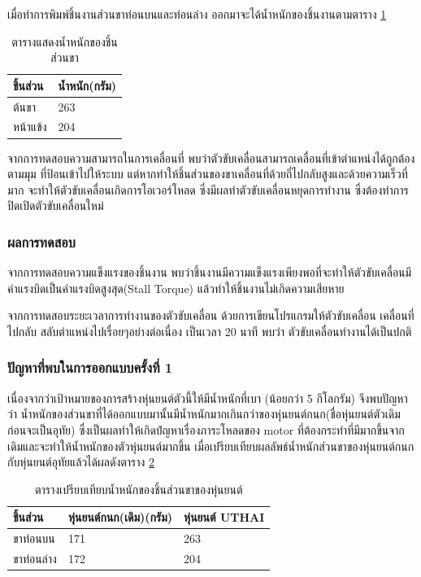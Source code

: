 เมื่อทำการพิมพ์ชิ้นงานส่วนขาท่อนบนและท่อนล่าง ออกมาจะได้น้ำหนักของชิ้นงานตามตาราง \ref{tab:UTHAI_leg}
\begin{table}[ht]
	\centering
	\begin{tabular}{| l | l |}
		\hline
		ชิ้นส่วน & น้ำหนัก(กรัม) \\
        \hline
        ต้นขา & 263 \\
        หน้าแข้ง & 204 \\
	    \hline
	\end{tabular}
	\caption{ตารางแสดงน้ำหนักของชิ้นส่วนขา}
	\label{tab:UTHAI_leg}
\end{table}

จากการทดสอบความสามารถในการเคลื่อนที่ พบว่าตัวขับเคลื่อนสามารถเคลื่อนที่เข้าตำแหน่งได้ถูกต้องตามมุม 
ที่ป้อนเข้าไปให้ระบบ แต่หากทำให้ชิ้นส่วนของขาเคลื่อนที่ด้วยถี่ไปกลับสูงและด้วยความเร็วที่มาก จะทำให้ตัวขับเคลื่อนเกิดการโอเวอร์โหลด 
ซึ่งมีผลทำตัวขับเคลื่อนหยุดการทำงาน ซึ่งต้องทำการปิดเปิดตัวขับเคลื่อนใหม่

\clearpage
\subsubsection*{ผลการทดสอบ}
จากการทดสอบความแข็งแรงของชิ้นงาน พบว่าชิ้นงานมีความแข็งแรงเพียงพอที่จะทำให้ตัวขับเคลื่อนมีค่าแรงบิดเป็นค่าแรงบิดสูงสุด(Stall Torque)
แล้วทำให้ชิ้นงานไม่เกิดความเสียหาย

จากการทดสอบระยะเวลาการทำงานของตัวขับเคลื่อน ด้วยการเขียนโปรแกรมให้ตัวขับเคลื่อน เคลื่อนที่ไปกลับ สลับตำแหน่งไปเรื่อยๆอย่างต่อเนื่อง เป็นเวลา 20 นาที
พบว่า ตัวขับเคลื่อนทำงานได้เป็นปกติ

\subsubsection*{ปัญหาที่พบในการออกแบบครั้งที่ 1}
เนื่องจากว่าเป้าหมายของการสร้างหุ่นยนต์ตัวนี้ให้มีน้ำหนักที่เบา (น้อยกว่า 5 กิโลกรัม) จึงพบปัญหาว่า
น้ำหนักของส่วนขาที่ได้ออกแบบมานั้นมีน้ำหนักมากเกินกว่าของหุ่นยนต์กนก(ชื่อหุ่นยนต์ตัวเดิมก่อนจะเป็นอุทัย)
ซึ่งเป็นผลทำให้เกิดปํญหาเรื่องภาระโหลดของ motor ที่ต้องกระทำที่มีมากขึ้นจากเดิมและจะทำให้น้ำหนักของตัวหุ่นยนต์มากขึ้น 
เมื่อเปรียบเทียบผลลัพธ์น้ำหนักส่วนขาของหุ่นยนต์กนกกับหุ่นยนต์อุทัยแล้วได้ผลดังตาราง \ref{tab:UTHAI_KANOK_Comp}

\begin{table}[ht]
	\centering
	\begin{tabular}{| l | l | l |}
		\hline
        ชิ้นส่วน & หุ่นยนต์กนก(เดิม)(กรัม) & หุ่นยนต์ UTHAI \\
        \hline
        ขาท่อนบน & 171 & 263 \\
        ขาท่อนล่าง & 172 & 204 \\
	    \hline
	\end{tabular}
	\caption{ตารางเปรียบเทียบน้ำหนักของชิ้นส่วนขาของหุ่นยนต์}
	\label{tab:UTHAI_KANOK_Comp}
\end{table}

